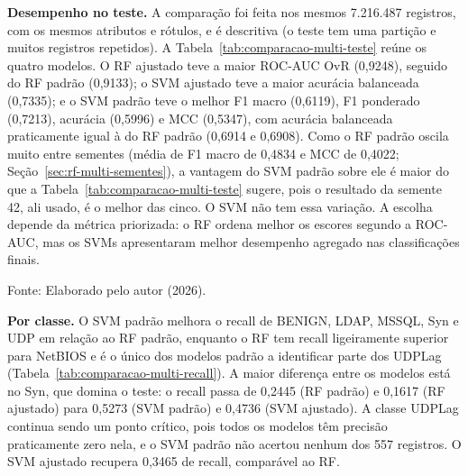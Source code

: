 \documentclass[
    12pt,                %
    openright,           %
    oneside,             %
    a4paper,             %
    english,             %
    brazil               %
]{abntex2}
\begin{document}
\textbf{Desempenho no teste.} A comparação foi feita nos mesmos 7.216.487 registros, com os mesmos atributos e rótulos, e é descritiva (o teste tem uma partição e muitos registros repetidos). A Tabela~\ref{tab:comparacao-multi-teste} reúne os quatro modelos. O RF ajustado teve a maior ROC-AUC OvR (0,9248), seguido do RF padrão (0,9133); o SVM ajustado teve a maior acurácia balanceada (0,7335); e o SVM padrão teve o melhor F1 macro (0,6119), F1 ponderado (0,7213), acurácia (0,5996) e MCC (0,5347), com acurácia balanceada praticamente igual à do RF padrão (0,6914 e 0,6908). Como o RF padrão oscila muito entre sementes (média de F1 macro de 0,4834 e MCC de 0,4022; Seção~\ref{sec:rf-multi-sementes}), a vantagem do SVM padrão sobre ele é maior do que a Tabela~\ref{tab:comparacao-multi-teste} sugere, pois o resultado da semente 42, ali usado, é o melhor das cinco. O SVM não tem essa variação. A escolha depende da métrica priorizada: o RF ordena melhor os escores segundo a ROC-AUC, mas os SVMs apresentaram melhor desempenho agregado nas classificações finais.
 
\begin{table}
\centering
\caption{Desempenho dos modelos multiclasse no teste}
\label{tab:comparacao-multi-teste}
\footnotesize
{}
\par\smallskip
Fonte: Elaborado pelo autor (2026).
\end{table}
 
\textbf{Por classe.} O SVM padrão melhora o recall de BENIGN, LDAP, MSSQL, Syn e UDP em relação ao RF padrão, enquanto o RF tem recall ligeiramente superior para NetBIOS e é o único dos modelos padrão a identificar parte dos UDPLag (Tabela~\ref{tab:comparacao-multi-recall}). A maior diferença entre os modelos está no Syn, que domina o teste: o recall passa de 0,2445 (RF padrão) e 0,1617 (RF ajustado) para 0,5273 (SVM padrão) e 0,4736 (SVM ajustado). A classe UDPLag continua sendo um ponto crítico, pois todos os modelos têm precisão praticamente zero nela, e o SVM padrão não acertou nenhum dos 557 registros. O SVM ajustado recupera 0,3465 de recall, comparável ao RF.
 
\end{document}
